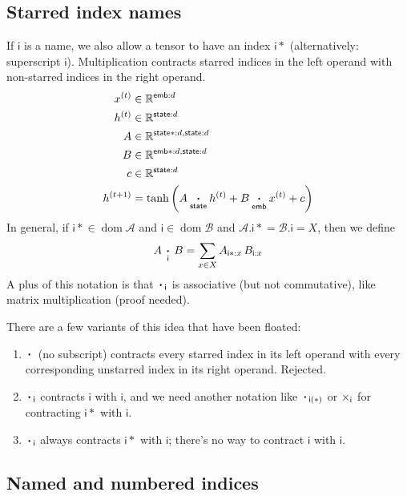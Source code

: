 \documentclass{article}
\newcommand{\name}[1]{\mathsf{#1}}
\newcommand{\ndot}[1]{\mathbin{\mathop{\thinspace\boldsymbol\cdot\thinspace}\displaylimits_{\name{#1}}}}
\DeclareMathOperator{\tupledom}{dom}
\newcommand{\tupleproj}[2]{#1.#2}
\begin{document}
\subsection{Starred index names}

If $\name{i}$ is a name, we also allow a tensor to have an index $\name{i*}$ (alternatively: superscript $\name{i}$). Multiplication contracts starred indices in the left operand with non-starred indices in the right operand.
\begin{align*}
x^{(t)} &\in \mathbb{R}^{\name{emb}: d} \\
h^{(t)} &\in \mathbb{R}^{\name{state}: d} \\
A &\in \mathbb{R}^{\name{state*}: d, \name{state}: d} \\
B &\in \mathbb{R}^{\name{emb*}: d, \name{state}: d} \\
c &\in \mathbb{R}^{\name{state}: d} \\
h^{(t+1)} &= \tanh\left( A \ndot{state} h^{(t)} + B \ndot{emb} x^{(t)} + c \right) 
\end{align*}
In general, if $\name{i*} \in \tupledom \mathcal{A}$ and $\name{i} \in \tupledom \mathcal{B}$ and $\tupleproj{\mathcal{A}}{\name{i*}} = \tupleproj{\mathcal{B}}{\name{i}} = X$, then we define
\begin{equation*}
A \ndot{i} B = \sum_{x \in X} A_{\name{i*}: x} \, B_{\name{i}: x}
\end{equation*}
A plus of this notation is that $\ndot{i}$ is associative (but not commutative), like matrix multiplication (proof needed).

There are a few variants of this idea that have been floated:
\begin{enumerate}
\item $\ndot{}$ (no subscript) contracts every starred index in its left operand with every corresponding unstarred index in its right operand. Rejected.
\item $\ndot{i}$ contracts $\name{i}$ with $\name{i}$, and we need another notation like $\ndot{i(*)}$ or $\mathop\times\displaylimits_{\name{i}}$ for contracting $\name{i*}$ with $\name{i}$.
\item $\ndot{i}$ always contracts $\name{i*}$ with $\name{i}$; there's no way to contract $\name{i}$ with $\name{i}$.
\end{enumerate}

\subsection{Named and numbered indices}
\label{sec:tensorsoftensors}
\end{document}
